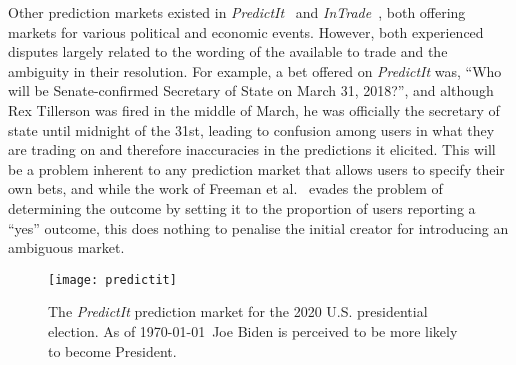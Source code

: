 Other prediction markets existed in \emph{PredictIt}~\cite{PredictIt} and
\emph{InTrade}~\cite{InTrade}, both offering markets for various political and
economic events. However, both experienced disputes largely related to the
wording of the available to trade and the ambiguity in their resolution. For
example, a bet offered on \emph{PredictIt} was, ``Who will be Senate-confirmed
Secretary of State on March 31, 2018?'', and although Rex Tillerson was fired
in the middle of March, he was officially the secretary of state until midnight
of the 31st, leading to confusion among users in what they are trading on and
therefore inaccuracies in the predictions it elicited. This will be a problem
inherent to any prediction market that allows users to specify their own bets,
and while the work of Freeman et al.~\cite{Freeman2017} evades the problem of
determining the outcome by setting it to the proportion of users reporting a
``yes'' outcome, this does nothing to penalise the initial creator for
introducing an ambiguous market.

\begin{figure}[h]
	\centering
	\texttt{[image: predictit]}
	\caption{The \emph{PredictIt} prediction market for the 2020 U.S.
	presidential election. As of \today\ Joe Biden is perceived to be more
	likely to become President.}
	\label{fig:predictit}
\end{figure}
